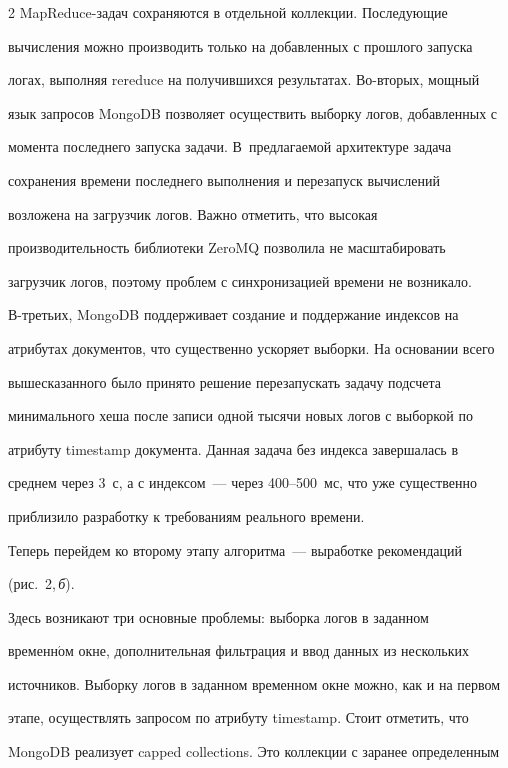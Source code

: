\begin{multicols}{2}
   MapReduce-за\-дач сохраняются в отдельной коллекции. Последующие 


вычисления можно производить только на добавленных с прошлого запуска 


логах, выполняя rereduce на получившихся результатах. Во-вто\-рых, мощный 


язык запросов MongoDB позволяет осуществить выборку логов, добавленных с 


момента последнего запуска задачи. В~предлагаемой архитектуре задача 


сохранения времени последнего выполнения и перезапуск вы\-чис\-ле\-ний 


возложена на загрузчик логов. Важно отметить, что высокая 


производительность библиотеки ZeroMQ позволила не масштабировать 


загрузчик логов, поэтому проблем с синхронизацией времени не возникало. 


   В-третьих, MongoDB поддерживает создание и поддержание индексов на 


атрибутах документов, что существенно ускоряет выборки. На основании всего 


вышесказанного было принято решение перезапускать задачу подсчета 


минимального хеша после записи одной тысячи новых логов с выборкой по 


атрибуту {\sf timestamp} документа. Данная задача без индекса завершалась в 


среднем через 3~с, а с индексом~--- через 400--500~мс, что уже существенно 


приблизило разработку к требованиям реального времени.


   


   Теперь перейдем ко второму этапу алгоритма~--- выработке рекомендаций


   (рис.~2,\,\textit{б}). 


Здесь возникают три основные проблемы: выборка логов в заданном 


временн$\acute{\mbox{о}}$м окне, дополнительная фильтрация и ввод данных из нескольких 


источников. Выборку логов в заданном временном окне можно, как и на первом 


этапе, осуществлять запросом по атрибуту {\sf timestamp}. Стоит отметить, что 


MongoDB реализует capped collections. Это коллекции с заранее определенным 



\end{multicols}

